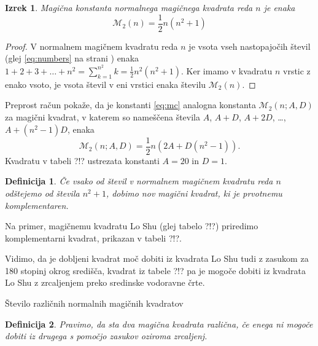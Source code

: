 \documentclass[a4paper,12pt]{article}
\newtheorem{definicija}{Definicija}
\newtheorem{izrek}{Izrek}
\newcommand{\m}{\mathcal{M}_2}
\newcommand{\pojem}[1]{\emph{\color{purple}#1}}
\begin{document}
   
   \begin{izrek}
      Magična konstanta normalnega magičnega kvadrata reda \(n\)
      je enaka
      \begin{equation}
         \label{eq:mc}
         \m(n) = \frac{1}{2} n(n^2+1)
      \end{equation}
   \end{izrek}

  \begin{proof}
    V normalnem magičnem kvadratu reda $n$ je vsota vseh nastopajočih
    števil (glej \eqref{eq:numbers} na strani \pageref{eq:numbers}) enaka
    $1+2+3+\dots+n^2=\sum_{k=1}^{n^2}k=\frac{1}{2}n^2(n^2+1)$. Ker imamo
    v kvadratu $n$ vrstic z enako vsoto, je vsota števil v eni vrstici
    enaka številu $\m(n)$. %
  \end{proof}

Preprost račun pokaže, da je konstanti \eqref{eq:mc} analogna konstanta
$\m(n;A,D)$ za magični kvadrat, v katerem so nameščena števila
$A$, $A+D$, $A+2D$, \dots, $A+(n^2-1)D$, enaka %
\[\m(n;A,D)=\frac{1}{2}n(2A+D(n^2-1)).\]
Kvadratu v tabeli ?!? ustrezata konstanti $A=20$ in $D=1$.

\begin{definicija}
      Če vsako od števil v normalnem magičnem kvadratu reda $n$ odštejemo
      od števila $n^2+1$, dobimo nov magični kvadrat, ki je prvotnemu
      \pojem{komplementaren}.
\end{definicija}

Na primer, magičnemu kvadratu Lo Shu (glej tabelo ?!?) priredimo
komplementarni kvadrat, prikazan v tabeli ?!?.
%

Vidimo, da je dobljeni kvadrat moč dobiti iz kvadrata Lo Shu tudi z zasukom za
180 stopinj okrog središča, kvadrat iz tabele ?!? pa je mogoče dobiti
iz kvadrata Lo Shu z zrcaljenjem preko sredinske vodoravne črte.

Število različnih normalnih magičnih kvadratov

\begin{definicija}
      Pravimo, da sta dva magična kvadrata \pojem{različna}, če enega ni mogoče dobiti
      iz drugega s pomočjo zasukov oziroma zrcaljenj.
\end{definicija}
\end{document}
